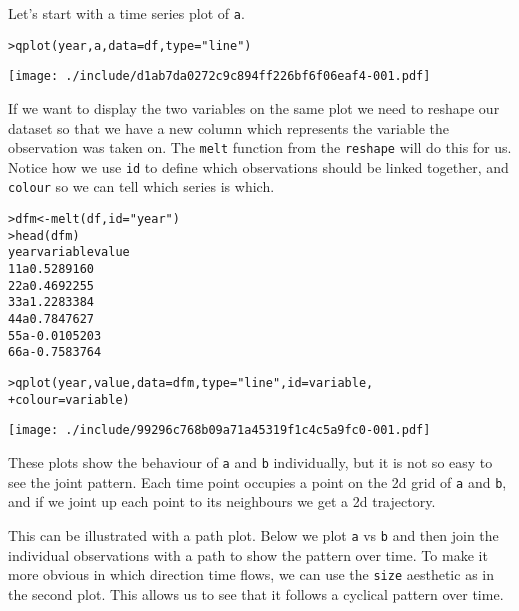 Let's start with a time series plot of {\tt a}.

\begin{alltt}
> qplot(year, a, data = df, type = "line")
\end{alltt}
\texttt{[image: ./include/d1ab7da0272c9c894ff226bf6f06eaf4-001.pdf]}
\begin{alltt}

\end{alltt}%

If we want to display the two variables on the same plot we need to reshape our dataset so that we have a new column which represents the variable the observation was taken on.  The {\tt melt} function from the {\tt reshape} will do this for us.  Notice how we use {\tt id} to define which observations should be linked together, and {\tt colour} so we can tell which series is which.

\begin{alltt}
> dfm <- melt(df, id = "year")
> head(dfm)
  year variable      value
1    1        a  0.5289160
2    2        a  0.4692255
3    3        a  1.2283384
4    4        a  0.7847627
5    5        a -0.0105203
6    6        a -0.7583764

> qplot(year, value, data = dfm, type = "line", id = variable, 
+     colour = variable)
\end{alltt}
\texttt{[image: ./include/99296c768b09a71a45319f1c4c5a9fc0-001.pdf]}
\begin{alltt}

\end{alltt}%

These plots show the behaviour of {\tt a} and {\tt b} individually, but it is not so easy to see the joint pattern.  Each time point occupies a point on the 2d grid of {\tt a} and {\tt b}, and if we joint up each point to its neighbours we get a 2d trajectory.

This can be illustrated with a path plot.  Below we plot {\tt a} vs {\tt b} and then join the individual observations with a path to show the pattern over time.  To make it more obvious in which direction time flows, we can use the {\tt size} aesthetic as in the second plot.   This allows us to see that it follows a cyclical pattern over time.

